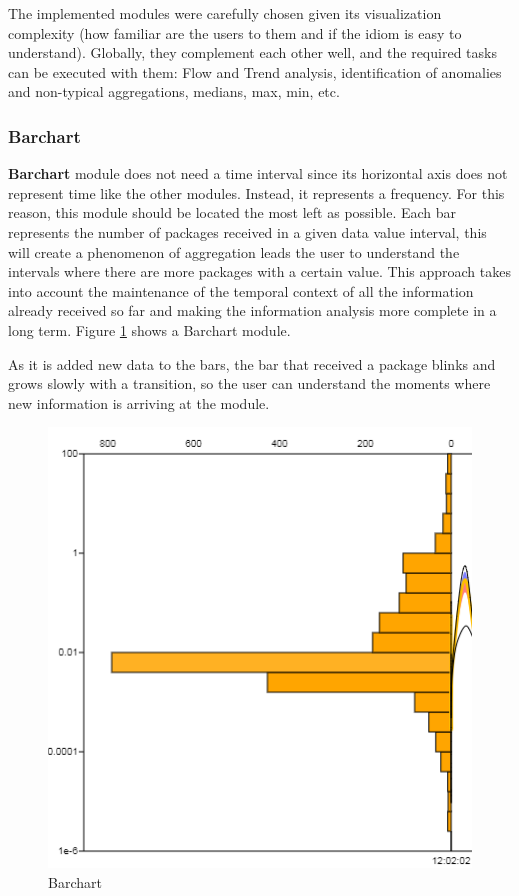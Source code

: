 \documentclass[letterpaper, 10 pt, conference]{ieeeconf}  %
\begin{document}
The implemented modules were carefully chosen given its visualization complexity (how familiar are the users to them and if the idiom is easy to understand). Globally, they complement each other well, and the required tasks can be executed with them: Flow and Trend analysis, identification of anomalies and non-typical aggregations, medians, max, min, etc.


\subsubsection{Barchart}
\label{subsubsection:barchart}
\textbf{Barchart} module does not need a time interval since its horizontal axis does not represent time like the other modules. Instead, it represents a frequency. For this reason, this module should be located the most left as possible. Each bar represents the number of packages received in a given data value interval, this will create a phenomenon of aggregation leads the user to understand the intervals where there are more packages with a certain value. \newline 
This approach takes into account the maintenance of the temporal context of all the information already received so far and making the information analysis more complete in a long term. Figure \ref{fig:barchart} shows a Barchart module.

As it is added new data to the bars, the bar that received a package blinks and grows slowly with a transition, so the user can understand the moments where new information is arriving at the module.

\begin{figure}[ht]
    \centering
    \includegraphics[width=0.8\linewidth]{Figures/barchart.png}
    \caption{Barchart}
        \label{fig:barchart}
\end{figure}
\end{document}
